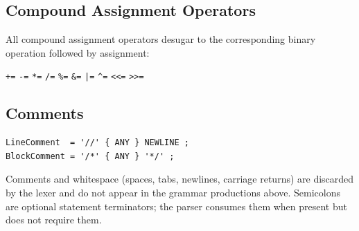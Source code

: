 \subsection{Compound Assignment Operators}

All compound assignment operators desugar to the corresponding binary
operation followed by assignment:

\begin{center}
\texttt{+=} \quad \texttt{-=} \quad \texttt{*=} \quad \texttt{/=} \quad \texttt{\%=} \quad
\texttt{\&=} \quad \texttt{|=} \quad \texttt{\^{}=} \quad \texttt{<<=} \quad \texttt{>>=}
\end{center}

\subsection{Comments}

\begin{lstlisting}[style=ebnf]
LineComment  = '//' { ANY } NEWLINE ;
BlockComment = '/*' { ANY } '*/' ;
\end{lstlisting}

Comments and whitespace (spaces, tabs, newlines, carriage returns) are
discarded by the lexer and do not appear in the grammar productions above.
Semicolons are optional statement terminators; the parser consumes them
when present but does not require them.
